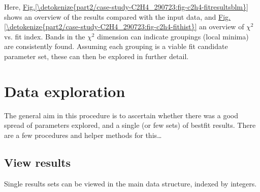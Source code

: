 \documentclass[letterpaper,table,10pt,english]{jupyterBook}
\begin{document}
\sphinxAtStartPar
Here, \hyperref[\detokenize{part2/case-study-C2H4_290723:fig-c2h4-fitresultsblm}]{Fig.\@ \ref{\detokenize{part2/case-study-C2H4_290723:fig-c2h4-fitresultsblm}}} shows an overview of the results compared with the input data, and \hyperref[\detokenize{part2/case-study-C2H4_290723:fig-c2h4-fithist}]{Fig.\@ \ref{\detokenize{part2/case-study-C2H4_290723:fig-c2h4-fithist}}} an overview of \(\chi^2\) vs. fit index. Bands in the \(\chi^2\) dimension can indicate groupings (local minima) are consistently found. Assuming each grouping is a viable fit candidate parameter set, these can then be explored in further detail.


\section{Data exploration}
\label{\detokenize{part2/case-study-C2H4_290723:data-exploration}}
\sphinxAtStartPar
The general aim in this procedure is to ascertain whether there was a good spread of parameters explored, and a single (or few sets) of best\sphinxhyphen{}fit results. There are a few procedures and helper methods for this…


\subsection{View results}
\label{\detokenize{part2/case-study-C2H4_290723:view-results}}
\sphinxAtStartPar
Single results sets can be viewed in the main data structure, indexed by integers.
\end{document}
